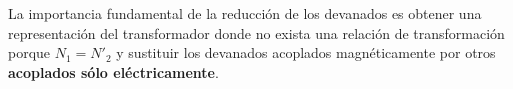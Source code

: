 La importancia fundamental de la reducción de los devanados es obtener una representación del transformador donde no exista una relación de transformación porque $N_{1}=N'_{2}$ y sustituir los devanados acoplados magnéticamente por otros \textbf{acoplados sólo eléctricamente}.

